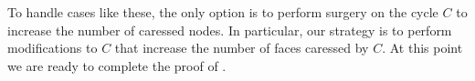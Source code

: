 \documentclass[a4paper,UKenglish]{socg-lipics-v2019}
\newcommand{\dual}[1]{{#1}^\star}
\begin{document}
To handle cases like these, the only option is to perform surgery on
the cycle $C$ to increase the number of caressed nodes. In particular,
our strategy is to perform modifications to $C$ that increase the number
of faces caressed by $C$.
%
%
%
At this point we are ready to complete the proof of .
\end{document}
